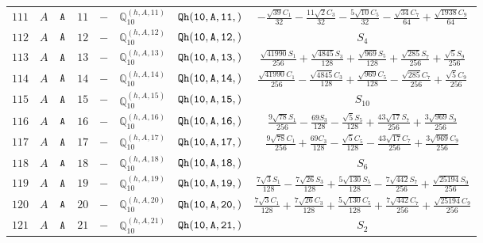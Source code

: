 \documentclass[fleqn,8pt]{jsarticle}
\begin{document}
\begin{table}[ht!]
\begin{center}
\begin{tabular}{cccccccc}
$ 111 $ & $ A $ & $ {\tt A} $ & $ 11 $ & $ - $ & $ \mathbb{Q}_{10}^{(h,A,11)} $ & $ {\tt Qh(10,A,11,)} $ & $ - \frac{\sqrt{39} C_{1}}{32} - \frac{11 \sqrt{2} C_{3}}{32} - \frac{5 \sqrt{10} C_{5}}{32} - \frac{\sqrt{34} C_{7}}{64} + \frac{\sqrt{1938} C_{9}}{64} $ \\
$ 112 $ & $ A $ & $ {\tt A} $ & $ 12 $ & $ - $ & $ \mathbb{Q}_{10}^{(h,A,12)} $ & $ {\tt Qh(10,A,12,)} $ & $ S_{4} $ \\
$ 113 $ & $ A $ & $ {\tt A} $ & $ 13 $ & $ - $ & $ \mathbb{Q}_{10}^{(h,A,13)} $ & $ {\tt Qh(10,A,13,)} $ & $ \frac{\sqrt{41990} S_{1}}{256} + \frac{\sqrt{4845} S_{3}}{128} + \frac{\sqrt{969} S_{5}}{128} + \frac{\sqrt{285} S_{7}}{256} + \frac{\sqrt{5} S_{9}}{256} $ \\
$ 114 $ & $ A $ & $ {\tt A} $ & $ 14 $ & $ - $ & $ \mathbb{Q}_{10}^{(h,A,14)} $ & $ {\tt Qh(10,A,14,)} $ & $ \frac{\sqrt{41990} C_{1}}{256} - \frac{\sqrt{4845} C_{3}}{128} + \frac{\sqrt{969} C_{5}}{128} - \frac{\sqrt{285} C_{7}}{256} + \frac{\sqrt{5} C_{9}}{256} $ \\
$ 115 $ & $ A $ & $ {\tt A} $ & $ 15 $ & $ - $ & $ \mathbb{Q}_{10}^{(h,A,15)} $ & $ {\tt Qh(10,A,15,)} $ & $ S_{10} $ \\
$ 116 $ & $ A $ & $ {\tt A} $ & $ 16 $ & $ - $ & $ \mathbb{Q}_{10}^{(h,A,16)} $ & $ {\tt Qh(10,A,16,)} $ & $ \frac{9 \sqrt{78} S_{1}}{256} - \frac{69 S_{3}}{128} - \frac{\sqrt{5} S_{5}}{128} + \frac{43 \sqrt{17} S_{7}}{256} + \frac{3 \sqrt{969} S_{9}}{256} $ \\
$ 117 $ & $ A $ & $ {\tt A} $ & $ 17 $ & $ - $ & $ \mathbb{Q}_{10}^{(h,A,17)} $ & $ {\tt Qh(10,A,17,)} $ & $ \frac{9 \sqrt{78} C_{1}}{256} + \frac{69 C_{3}}{128} - \frac{\sqrt{5} C_{5}}{128} - \frac{43 \sqrt{17} C_{7}}{256} + \frac{3 \sqrt{969} C_{9}}{256} $ \\
$ 118 $ & $ A $ & $ {\tt A} $ & $ 18 $ & $ - $ & $ \mathbb{Q}_{10}^{(h,A,18)} $ & $ {\tt Qh(10,A,18,)} $ & $ S_{6} $ \\
$ 119 $ & $ A $ & $ {\tt A} $ & $ 19 $ & $ - $ & $ \mathbb{Q}_{10}^{(h,A,19)} $ & $ {\tt Qh(10,A,19,)} $ & $ \frac{7 \sqrt{3} S_{1}}{128} - \frac{7 \sqrt{26} S_{3}}{128} + \frac{5 \sqrt{130} S_{5}}{128} - \frac{7 \sqrt{442} S_{7}}{256} + \frac{\sqrt{25194} S_{9}}{256} $ \\
$ 120 $ & $ A $ & $ {\tt A} $ & $ 20 $ & $ - $ & $ \mathbb{Q}_{10}^{(h,A,20)} $ & $ {\tt Qh(10,A,20,)} $ & $ \frac{7 \sqrt{3} C_{1}}{128} + \frac{7 \sqrt{26} C_{3}}{128} + \frac{5 \sqrt{130} C_{5}}{128} + \frac{7 \sqrt{442} C_{7}}{256} + \frac{\sqrt{25194} C_{9}}{256} $ \\
$ 121 $ & $ A $ & $ {\tt A} $ & $ 21 $ & $ - $ & $ \mathbb{Q}_{10}^{(h,A,21)} $ & $ {\tt Qh(10,A,21,)} $ & $ S_{2} $ \\
 \hline \hline
\end{tabular}
\end{center}
\end{table}
\end{document}
